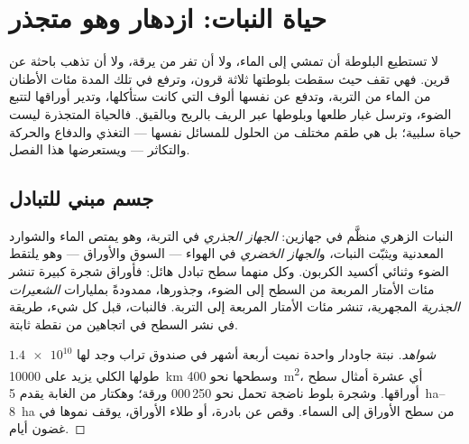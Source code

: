 \chapter{حياة النبات: ازدهار وهو متجذر}\label{ch:g12:plant-rooted-life}

لا تستطيع البلوطة أن تمشي إلى الماء، ولا أن تفر من يرقة، ولا أن تذهب
باحثة عن قرين. فهي تقف حيث سقطت بلوطتها ثلاثة قرون، وترفع في تلك المدة
مئات الأطنان من الماء من التربة، وتدفع عن نفسها ألوف  التي كانت
ستأكلها، وتدير أوراقها لتتبع الضوء، وترسل غبار طلعها وبلوطها عبر الريف
بالريح وبالقيق. فالحياة المتجذرة ليست حياة سلبية؛ بل هي طقم مختلف من
الحلول للمسائل نفسها --- التغذي والدفاع والحركة والتكاثر --- ويستعرضها
هذا الفصل.

\section{جسم مبني للتبادل}

\begin{proposition}\label{prop:g12:plant-rooted-life:surfaces}
النبات الزهري منظَّم في جهازين: \emph{الجهاز الجذري} في التربة، وهو
يمتص الماء والشوارد المعدنية ويثبّت النبات، و\emph{الجهاز الخضري} في
الهواء --- السوق والأوراق --- وهو يلتقط الضوء وثنائي أكسيد الكربون.
وكل منهما سطح تبادل هائل: فأوراق شجرة كبيرة تنشر مئات الأمتار المربعة
من السطح إلى الضوء، وجذورها، ممدودةً بمليارات \emph{الشعيرات
الجذرية} المجهرية، تنشر مئات الأمتار المربعة إلى
التربة. فالنبات، قبل كل شيء، طريقة في نشر السطح في اتجاهين من نقطة
ثابتة.
\end{proposition}
\begin{proof}[شواهد]
نبتة جاودار واحدة نميت أربعة أشهر في صندوق تراب وجد لها
$\num{1.4e10}$  طولها الكلي يزيد على
\qty{10000}{km} وسطحها نحو \qty{400}{m^2}، أي عشرة أمثال سطح أوراقها.
وشجرة بلوط ناضجة تحمل نحو 250\,000 ورقة؛ وهكتار من الغابة يقدم
\qtyrange{5}{8}{ha} من سطح الأوراق إلى السماء. وقص 
عن بادرة، أو طلاء الأوراق، يوقف نموها في غضون أيام.
\end{proof}

